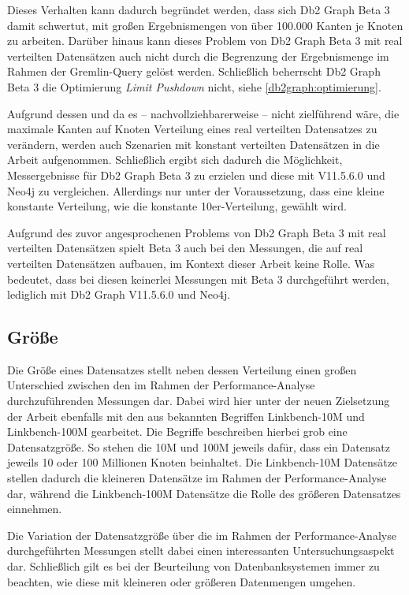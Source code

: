 Dieses Verhalten kann dadurch begründet werden, dass sich Db2 Graph Beta 3 damit schwertut, mit großen Ergebnismengen von über 100.000 Kanten je Knoten zu arbeiten. Darüber hinaus kann dieses Problem von Db2 Graph Beta 3 mit real verteilten Datensätzen auch nicht durch die Begrenzung der Ergebnismenge im Rahmen der Gremlin-Query gelöst werden. Schließlich beherrscht Db2 Graph Beta 3 die Optimierung \textit{Limit Pushdown} nicht, siehe \autoref{db2graph:optimierung}. 

Aufgrund dessen und da es -- nachvollziehbarerweise -- nicht zielführend wäre, die maximale Kanten auf Knoten Verteilung eines real verteilten Datensatzes zu verändern, werden auch Szenarien mit konstant verteilten Datensätzen in die Arbeit aufgenommen. Schließlich ergibt sich dadurch die Möglichkeit, Messergebnisse für Db2 Graph Beta 3 zu erzielen und diese mit V11.5.6.0 und Neo4j zu vergleichen. Allerdings nur unter der Voraussetzung, dass eine kleine konstante Verteilung, wie die konstante 10er-Verteilung, gewählt wird. 

Aufgrund des zuvor angesprochenen Problems von Db2 Graph Beta 3 mit real verteilten Datensätzen spielt Beta 3 auch bei den Messungen, die auf real verteilten Datensätzen aufbauen, im Kontext dieser Arbeit keine Rolle. Was bedeutet, dass bei diesen keinerlei Messungen mit Beta 3 durchgeführt werden, lediglich mit Db2 Graph V11.5.6.0 und Neo4j. 

\subsection{Größe}
Die Größe eines Datensatzes stellt neben dessen Verteilung einen großen Unterschied zwischen den im Rahmen der Performance-Analyse durchzuführenden Messungen dar. Dabei wird hier unter der neuen Zielsetzung der Arbeit ebenfalls mit den aus \cite{sigmod_tian} bekannten Begriffen Linkbench-10M und Linkbench-100M gearbeitet. Die Begriffe beschreiben hierbei grob eine Datensatzgröße. So stehen die 10M und 100M jeweils dafür, dass ein Datensatz jeweils 10 oder 100 Millionen Knoten beinhaltet. Die Linkbench-10M Datensätze stellen dadurch die kleineren Datensätze im Rahmen der Performance-Analyse dar, während die Linkbench-100M Datensätze die Rolle des größeren Datensatzes einnehmen. 

Die Variation der Datensatzgröße über die im Rahmen der Performance-Analyse durchgeführten Messungen stellt dabei einen interessanten Untersuchungsaspekt dar. Schließlich gilt es bei der Beurteilung von Datenbanksystemen immer zu beachten, wie diese mit kleineren oder größeren Datenmengen umgehen.

